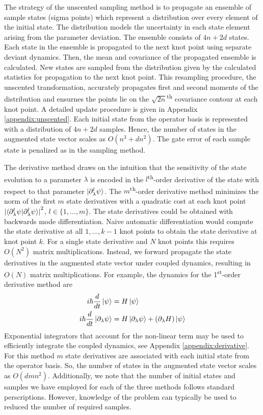 The strategy of the unscented sampling method is to
propagate an ensemble of sample states (sigma points) which represent a distribution
over every element of the initial state. The distribution
models the uncertainty in each state element arising from the
parameter deviation. The ensemble consists of $4n + 2d$ states.
Each state in the
ensemble is propagated to the next
knot point using separate deviant dynamics. Then, the mean and covariance of
the propagated ensemble is calculated. New states are sampled from the distribution
given by the calculated statistics for propagation to the next knot point.
This resampling procedure, the unscented transformation, accurately propagates
first and second moments of the distribution and ensurnes the points
lie on the $\sqrt{2n}$\textsuperscript{th}
covariance contour at each knot point. A detailed update procedure is given
in Appendix \ref{appendix:unscented}. Each initial state from the operator basis
is represented with a distribution of $4n + 2d$ samples. Hence,
the number of states in the augmented state vector scales as $O(n^{3} + dn^{2})$.
The gate error of each sample state is penalized as in the sampling method.

The derivative method draws on the intuition that
the sensitivity of the state evolution to a parameter
$\lambda$ is encoded in the $l$\textsuperscript{th}-order
derivative of the state with respect to that parameter
$\ket{\partial_{\lambda}^{l} \psi}$. The $m$\textsuperscript{th}-order
derivative method minimizes the norm of the first $m$
state derivatives with a quadratic cost at each knot point
${\lvert \braket{\partial^{l}_{\lambda} \psi | \partial^{l}_{\lambda} \psi}
  \rvert}^{2}$, $l \in \{1, \dots, m\}$.
The state derivatives could be obtained with backwards mode differentiation.
Naive automatic differentiation would compute
the state derivative at all $1, \dots, k - 1$ knot points
to obtain the state derivative at knot point $k$.
For a single state derivative and $N$ knot points this
requires $O(N^2)$ matrix multiplications.
Instead, we forward propagate the state derivatives in the
augmented state vector under coupled dynamics, resulting in
$O(N)$ matrix multiplications. For example, the dynamics
for the 1\textsuperscript{st}-order derivative method are
\begin{align}
  i \hbar \frac{d}{dt} \ket{\psi} &= H \ket{\psi}\\
  i \hbar \frac{d}{dt} \ket{\partial_{\lambda}\psi} &=
  H \ket{\partial_{\lambda} \psi} +
  (\partial_{\lambda} H) \ket{\psi}
\end{align}
Exponential integrators that account for the non-linear
term may be used to efficiently integrate the coupled dynamics,
see Appendix \ref{appendix:derivative}.
For this method $m$ state derivatives are associated with each
initial state from the operator basis.
So, the number of states in the augmented state vector scales as
$O(dmn^{2})$. Additionally, we note that the number of initial
states and samples we have employed for each of the three
methods follows standard perscriptions. However, knowledge
of the problem can typically be used to reduced the number
of required samples.

